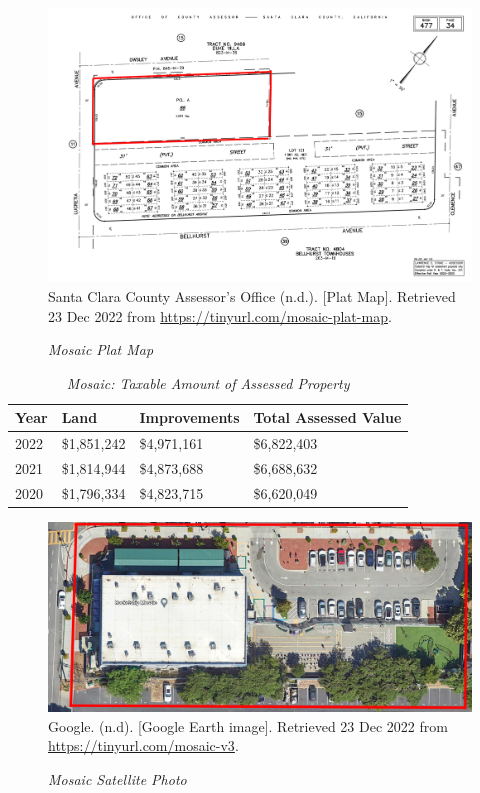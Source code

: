\begin{figure}[hbt]
    \caption[Mosaic Plat Map]{\textit{Mosaic Plat Map}}\label{fig:mosaic-plat-map}
    \includegraphics[width=\textwidth]{Assessor-Info/mosaic-plat-map-477-34}\\ %
    \footnotesize{Santa Clara County Assessor's Office (n.d.). [Plat Map]. Retrieved 23 Dec 2022 from  \url{https://tinyurl.com/mosaic-plat-map}}.
\end{figure}

\begin{table}[hbt]
  \SingleSpacing%
  \caption[Mosaic: Taxable Amount of Assessed Propery]{\textit{Mosaic: Taxable Amount of Assessed Property}}\label{tab:mosaic-taxable-amount}
  \begin{tabular}{llll}
    \toprule
    Year & Land        & Improvements & Total Assessed Value \\
    \midrule
    2022 & \$1,851,242 & \$4,971,161 & \$6,822,403 \\
    2021 & \$1,814,944 & \$4,873,688 & \$6,688,632 \\
    2020 & \$1,796,334 & \$4,823,715 & \$6,620,049 \\
    \bottomrule
  \end{tabular}
\end{table}

\begin{figure}[hbt]
  \caption[Mosaic Satellite Photo]{\textit{Mosaic Satellite Photo}}\label{fig:mosaic-sat-photo}
  \includegraphics[width=\textwidth]{Satellite-Photos/mosaic-sat-photo}\\ %
  \footnotesize{Google. (n.d). [Google Earth image]. Retrieved 23 Dec 2022 from \url{https://tinyurl.com/mosaic-v3}.}
\end{figure}

